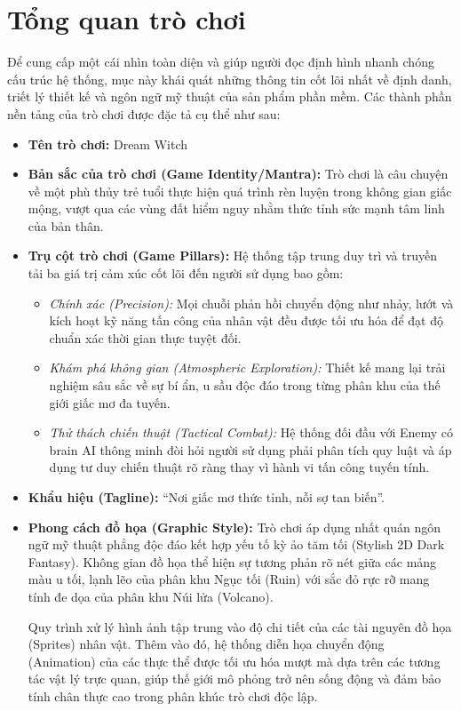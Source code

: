 \documentclass[../DoAn.tex]{subfiles}
\begin{document}
\section{Tổng quan trò chơi}
\label{section:3.1}

Để cung cấp một cái nhìn toàn diện và giúp người đọc định hình nhanh chóng cấu trúc hệ thống, mục này khái quát những thông tin cốt lõi nhất về định danh, triết lý thiết kế và ngôn ngữ mỹ thuật của sản phẩm phần mềm. Các thành phần nền tảng của trò chơi được đặc tả cụ thể như sau:

\begin{itemize}
    \item \textbf{Tên trò chơi:} Dream Witch
    \item \textbf{Bản sắc của trò chơi (Game Identity/Mantra):} Trò chơi là câu chuyện về một phù thủy trẻ tuổi thực hiện quá trình rèn luyện trong không gian giấc mộng, vượt qua các vùng đất hiểm nguy nhằm thức tỉnh sức mạnh tâm linh của bản thân. 
    \item \textbf{Trụ cột trò chơi (Game Pillars):} Hệ thống tập trung duy trì và truyền tải ba giá trị cảm xúc cốt lõi đến người sử dụng bao gồm:
    \begin{itemize}
        \item \textit{Chính xác (Precision):} Mọi chuỗi phản hồi chuyển động như nhảy, lướt và kích hoạt kỹ năng tấn công của nhân vật đều được tối ưu hóa để đạt độ chuẩn xác thời gian thực tuyệt đối.
        \item \textit{Khám phá không gian (Atmospheric Exploration):} Thiết kế mang lại trải nghiệm sâu sắc về sự bí ẩn, u sầu độc đáo trong từng phân khu của thế giới giấc mơ đa tuyến.
        \item \textit{Thử thách chiến thuật (Tactical Combat):} Hệ thống đối đầu với Enemy có brain AI thông minh đòi hỏi người sử dụng phải phân tích quy luật và áp dụng tư duy chiến thuật rõ ràng thay vì hành vi tấn công tuyến tính.
    \end{itemize}
    \item \textbf{Khẩu hiệu (Tagline):} ``Nơi giấc mơ thức tỉnh, nỗi sợ tan biến''. 
    \item \textbf{Phong cách đồ họa (Graphic Style):} Trò chơi áp dụng nhất quán ngôn ngữ mỹ thuật phẳng độc đáo kết hợp yếu tố kỳ ảo tăm tối (Stylish 2D Dark Fantasy). Không gian đồ họa thể hiện sự tương phản rõ nét giữa các mảng màu u tối, lạnh lẽo của phân khu Ngục tối (Ruin) với sắc đỏ rực rỡ mang tính đe dọa của phân khu Núi lửa (Volcano). 
    
    Quy trình xử lý hình ảnh tập trung vào độ chi tiết của các tài nguyên đồ họa (Sprites) nhân vật. Thêm vào đó, hệ thống diễn họa chuyển động (Animation) của các thực thể được tối ưu hóa mượt mà dựa trên các tương tác vật lý trực quan, giúp thế giới mô phỏng trở nên sống động và đảm bảo tính chân thực cao trong phân khúc trò chơi độc lập.
\end{itemize}
\end{document}
